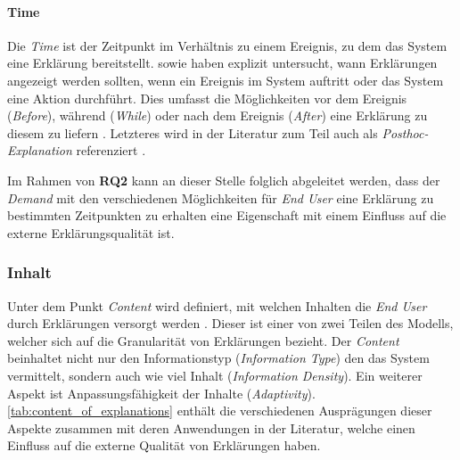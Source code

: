 \paragraph{Time} Die \textit{Time} ist der Zeitpunkt im Verhältnis zu einem Ereignis, zu dem das System eine Erklärung bereitstellt. \citeauthor{rosenfeld_explainability_2019} sowie \citeauthor{wiegand_id_2020} haben explizit untersucht, wann Erklärungen angezeigt werden sollten, wenn ein Ereignis im System auftritt oder das System eine Aktion durchführt. Dies umfasst die Möglichkeiten vor dem Ereignis (\textit{Before}), während (\textit{While}) oder nach dem Ereignis (\textit{After}) eine Erklärung zu diesem zu liefern \cite{rosenfeld_explainability_2019, wiegand_id_2020}. Letzteres wird in der Literatur zum Teil auch als \textit{Posthoc-Explanation} referenziert \cite{sokol_explainability_2020}.

\smallskip

Im Rahmen von \textbf{RQ2} kann an dieser Stelle folglich abgeleitet werden, dass der \textit{Demand} mit den verschiedenen Möglichkeiten für \textit{End User} eine Erklärung zu bestimmten Zeitpunkten zu erhalten eine Eigenschaft mit einem Einfluss auf die externe Erklärungsqualität ist.

\subsubsection{Inhalt}

Unter dem Punkt \textit{Content} wird definiert, mit welchen Inhalten die \textit{End User} durch Erklärungen versorgt werden \cite{nunes_systematic_2017}. Dieser ist einer von zwei Teilen des Modells, welcher sich auf die Granularität von Erklärungen bezieht. Der \textit{Content} beinhaltet nicht nur den Informationstyp (\textit{Information Type}) den das System vermittelt, sondern auch wie viel Inhalt (\textit{Information Density}). Ein weiterer Aspekt ist Anpassungsfähigkeit der Inhalte (\textit{Adaptivity}). \autoref{tab:content_of_explanations} enthält die verschiedenen Ausprägungen dieser Aspekte zusammen mit deren Anwendungen in der Literatur, welche einen Einfluss auf die externe Qualität von Erklärungen haben.


